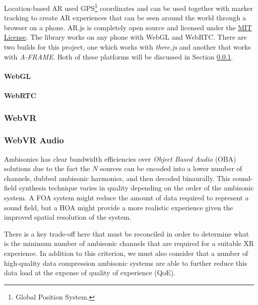 Location-based AR used GPS\footnote{Global Position System.} coordinates and can be used together with marker tracking to create AR experiences that can be seen around the world through a browser on a phone. AR.js is completely open source and licensed under the \href{https://mit-license.org/}{MIT License}. The library works on any phone with WebGL and WebRTC. There are two builds for this project, one which works with \textit{three.js} and another that works with \textit{A-FRAME}. Both of these platforms will be discussed in Section \ref{subsubsec:webvr}. 

\paragraph{WebGL}

\paragraph{WebRTC}

\subsubsection{WebVR}\label{subsubsec:webvr}


\subsubsection{WebVR Audio}

Ambisonics has clear bandwidth efficiencies over \textit{Object Based Audio} (OBA) solutions due to the fact the $N$ sources can be encoded into a lower number of channels, dubbed ambisonic harmonics, and then decoded binaurally. This sound-field synthesis technique varies in quality depending on the order of the ambisonic system. A FOA system might reduce the amount of data required to represent a sound field, but a HOA might provide a more realistic experience given the improved spatial resolution of the system.

There is a key trade-off here that must be reconciled in order to determine what is the minimum number of ambisonic channels that are required for a suitable XR experience. In addition to this criterion, we must also consider that a number of high-quality data compression ambisonic systems are able to further reduce this data load at the expense of quality of experience (QoE). 


